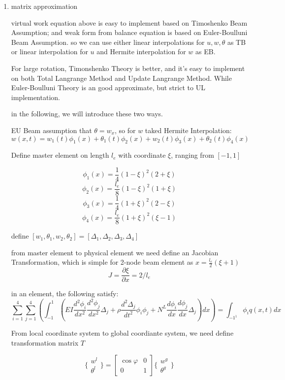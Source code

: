 \documentclass[11pt]{article}
\begin{document}
\begin{enumerate}
\item{matrix approximation}

virtual work equation above is easy to implement based on Timoshenko Beam Assumption; and weak form from balance equation is based on Euler-Boulluni Beam Assumption. so we can use either linear interpolations for $u, w, \theta$ as TB or linear interpolation for $u$ and Hermite interpolation for $w$ as EB.

For large rotation, Timonshenko Theory is better, and it's easy to implement on both Total Langrange Method and Update Langrange Method. While Euler-Boulluni Theory is  an good approximate, but strict to UL implementation.

in the following, we will introduce these two ways.


EU Beam assumption that $\theta = w_x$, so for $w$ taked Hermite Interpolation:
$$ w(x,t) = w_1(t) \phi_1(x) + \theta_1(t) \phi_2(x) + w_2(t) \phi_3(x) + \theta_2(t) \phi_4(x) $$

Define master element on length $l_e$ with coordinate $\xi$, ranging from $[-1, 1]$

$$ \phi_1(x) = \frac{1}{4} (1-\xi)^2 (2+\xi) $$
$$ \phi_2(x) = \frac{l_e}{8}(1-\xi)^2(1+\xi) $$
$$ \phi_3(x) = \frac{1}{4} (1+\xi)^2 (2-\xi) $$
$$ \phi_4(x) = \frac{l_e}{8}(1+\xi)^2(\xi-1) $$

define $[w_1, \theta_1, w_2, \theta_2] = [ \Delta_1, \Delta_2,\Delta_3, \Delta_4] $

from master element to physical element we need define an Jacobian Transformation, which is simple for 2-node  beam element  as $ x = \frac{l_e}{2} (\xi + 1)$
$$ J = \frac{\partial \xi}{\partial x} = 2/l_e $$


in an element, the following satisfy:
$$ \sum_{i=1}^4 \sum_{j=1}^4 ( \int_{-1}^{1}( EI \frac{d^2 \phi_i}{dx^2} \frac{d^2 \phi_j}{dx^2}\Delta_j + \rho \frac{d^2 \Delta_j}{dt^2} \phi_i \phi_j + N^L \frac{d \phi_i}{dx} \frac{d \phi_j}{dx} \Delta_j) dx) = \int_{-1^{1}} \phi_i q(x,t) dx $$  

From local coordinate system to global coordiante system, we need define transformation matrix $T$

$$
\{ \begin{array}{c} w^l \\ \theta^l \end{array} \} = \begin{bmatrix} \cos \varphi & 0 \\ 0 & 1 \end{bmatrix} \{ \begin{array}{c} w^g \\ \theta^g \end{array} \}
$$


\end{enumerate}
\end{document}
